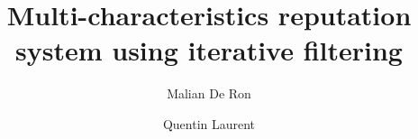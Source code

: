 \documentclass[10pt]{beamer}
\title{Multi-characteristics reputation system using iterative filtering}
\author[Malian DR, Quentin L]{
  \small
  Malian De Ron
 \and
  Quentin Laurent
}
\begin{document}
\begin{frame}
  \maketitle
\end{frame}


\end{document}

